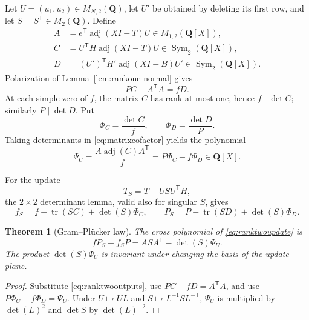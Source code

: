\documentclass[11pt,reqno]{amsart}
\newtheorem{theorem}{Theorem}[section]
\theoremstyle{definition}
\theoremstyle{remark}
\DeclareMathOperator{\adj}{adj}
\DeclareMathOperator{\tr}{tr}
\newcommand{\Q}{\mathbf Q}
\begin{document}
Let $U=(u_1,u_2)\in M_{N,2}(\Q)$, let $U'$ be obtained by deleting its first
row, and let $S=S^{\mathsf T}\in M_2(\Q)$.  Define
\begin{align}
 A&=e^{\mathsf T}\adj(XI-T)U\in M_{1,2}(\Q[X]),\label{eq:matrixA}\\
 C&=U^{\mathsf T}H\adj(XI-T)U\in\operatorname{Sym}_2(\Q[X]),\label{eq:matrixC}\\
 D&=(U')^{\mathsf T}H'\adj(XI-B)U'
 \in\operatorname{Sym}_2(\Q[X]).\label{eq:matrixD}
\end{align}
Polarization of Lemma~\ref{lem:rankone-normal} gives
\begin{equation}\label{eq:matrixcofactor}
 \boxed{PC-A^{\mathsf T}A=fD}.
\end{equation}
At each simple zero of $f$, the matrix $C$ has rank at most one, hence
$f\mid\det C$; similarly $P\mid\det D$.  Put
\begin{equation}\label{eq:phis}
 \Phi_C=\frac{\det C}{f},\qquad
 \Phi_D=\frac{\det D}{P}.
\end{equation}
Taking determinants in \eqref{eq:matrixcofactor} yields the polynomial
\begin{equation}\label{eq:Psi}
 \boxed{\Psi_U=\frac{A\adj(C)A^{\mathsf T}}{f}
 =P\Phi_C-f\Phi_D\in\Q[X]}.
\end{equation}

For the update
\begin{equation}\label{eq:ranktwoupdate}
 T_S=T+USU^{\mathsf T}H,
\end{equation}
the $2\times2$ determinant lemma, valid also for singular $S$, gives
\begin{equation}\label{eq:ranktwooutputs}
 f_S=f-\tr(SC)+\det(S)\Phi_C,\qquad
 P_S=P-\tr(SD)+\det(S)\Phi_D.
\end{equation}

\begin{theorem}[Gram--Pl\"ucker law]\label{thm:GP}
The cross polynomial of \eqref{eq:ranktwoupdate} is
\begin{equation}\label{eq:GP}
 \boxed{fP_S-f_SP=ASA^{\mathsf T}-\det(S)\Psi_U.}
\end{equation}
The product $\det(S)\Psi_U$ is invariant under changing the basis of the
update plane.
\end{theorem}

\begin{proof}
Substitute \eqref{eq:ranktwooutputs}, use
$PC-fD=A^{\mathsf T}A$, and use
$P\Phi_C-f\Phi_D=\Psi_U$.  Under
$U\mapsto UL$ and $S\mapsto L^{-1}SL^{-\mathsf T}$,
$\Psi_U$ is multiplied by $\det(L)^2$ and $\det S$ by $\det(L)^{-2}$.
\end{proof}
\end{document}
